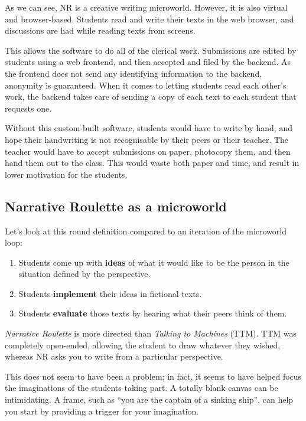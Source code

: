 As we can see, NR is a creative writing microworld. However, it is also
virtual and browser-based. Students read and write their texts in the
web browser, and discussions are had while reading texts from screens.

This allows the software to do all of the clerical work. Submissions are
edited by students using a web frontend, and then accepted and filed by
the backend. As the frontend does not send any identifying information
to the backend, anonymity is guaranteed. When it comes to letting
students read each other's work, the backend takes care of sending a
copy of each text to each student that requests one.

Without this custom-built software, students would have to write by
hand, and hope their handwriting is not recognisable by their peers or
their teacher. The teacher would have to accept submissions on paper,
photocopy them, and then hand them out to the class. This would waste
both paper and time, and result in lower motivation for the students.

\subsection{Narrative Roulette as a microworld}

Let's look at this round definition compared to an iteration of the
microworld loop: 

\begin{enumerate}
\item Students come up with \textbf{ideas} of what it would like to be the person in the situation defined by the perspective.
\item Students \textbf{implement} their ideas in fictional texts. 
\item Students \textbf{evaluate} those texts by hearing what their peers think
of them.
\end{enumerate}

\emph{Narrative Roulette} is more directed than \emph{Talking to
Machines} (TTM). TTM was completely open-ended, allowing the student to
draw whatever they wished, whereas NR asks you to write from a
particular perspective.

This does not seem to have been a problem; in fact, it seems to have
helped focus the imaginations of the students taking part. A totally
blank canvas can be intimidating. A frame, such as ``you are the captain
of a sinking ship'', can help you start by providing a trigger for your imagination.

